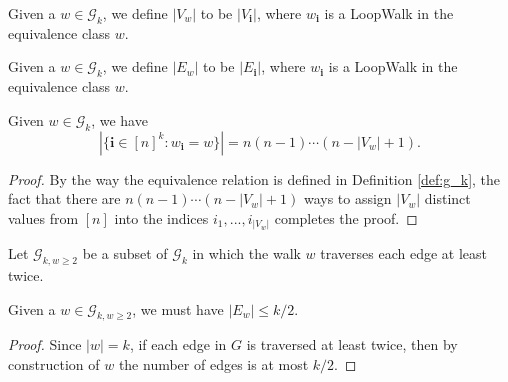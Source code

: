 \begin{definition}
  \label{def:abs.V_w}
  Given a  $w \in \mathcal{G}_k$, we define $|V_w|$ to be $|V_{\mathbf{i}}|$, where $w_{\mathbf{i}}$
  is a LoopWalk in the equivalence class $w$.
\end{definition}

\begin{definition}
  \label{def:abs.E_w}
  Given a  $w \in \mathcal{G}_k$, we define $|E_w|$ to be $|E_{\mathbf{i}}|$, where $w_{\mathbf{i}}$
  is a LoopWalk in the equivalence class $w$.
\end{definition}


\begin{lemma}
  \label{lem:lem_4.3}
  Given $w \in \mathcal{G}_k$, we have
  \[
   |\{ \mathbf{i} \in [n]^k : w_\mathbf{i} = w \}| = n (n-1) \cdots (n - |V_w| + 1).
  \]
\end{lemma}

\begin{proof}
  By the way the equivalence relation is defined in Definition \ref{def:g_k},
  the fact that there are $n (n - 1) \cdots (n -|V_w| + 1)$ ways to assign $|V_w|$ distinct values
  from $[n]$ into the indices $i_1,...,i_{|V_w|}$ completes the proof.
\end{proof}


\begin{definition}
  \label{def:g_k_ge_2}
  Let $\mathcal{G}_{k,w \geq 2}$ be a subset of $\mathcal{G}_k$ in which the walk $w$ traverses each edge at least twice.
\end{definition}


\begin{lemma}
  \label{lem:edge_set_order_leq_k_over_two}
  Given a $w \in \mathcal{G}_{k,w \geq 2}$, we must have $|E_w| \leq k/2$.
\end{lemma}

\begin{proof}
  Since $|w| = k$, if each edge in $G$ is traversed at least twice, then by construction of $w$ the
   number of edges is at most $k/2$.
\end{proof}


